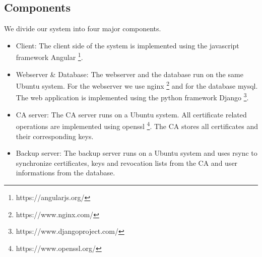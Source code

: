 \documentclass[english]{article}
\begin{document}









\subsection{Components}

We divide our system into four major components.
\begin{itemize}
\item Client: The client side of the system is implemented using the javascript framework Angular \footnote{https://angularjs.org/}.
\item Webserver \& Database: The webserver and the database run on the same Ubuntu system. For the webserver we use nginx \footnote{https://www.nginx.com/} and for the database mysql. The web application is implemented using the python framework Django \footnote{https://www.djangoproject.com/}.
\item CA server: The CA server runs on a Ubuntu system. All certificate related operations are implemented using openssl \footnote{https://www.openssl.org/}. The CA stores all certificates and their corresponding keys.
\item Backup server: The backup server runs on a Ubuntu system and uses rsync to synchronize certificates, keys and revocation lists from the CA and user informations from the database.
\end{itemize}

  
\end{document}
